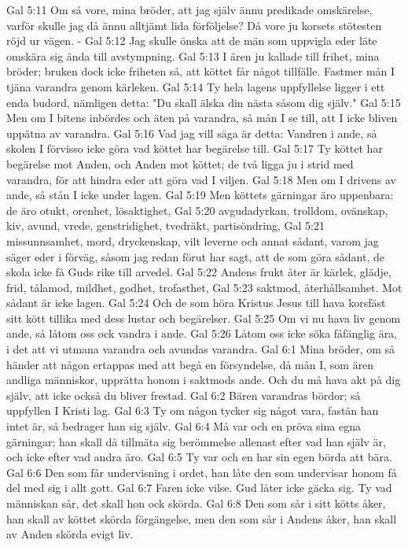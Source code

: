 Gal 5:11  Om så vore, mina bröder, att jag själv ännu predikade omskärelse, varför skulle jag då ännu alltjämt lida förföljelse? Då vore ju korsets stötesten röjd ur vägen. -
Gal 5:12  Jag skulle önska att de män som uppvigla eder läte omskära sig ända till avstympning.
Gal 5:13  I ären ju kallade till frihet, mina bröder; bruken dock icke friheten så, att köttet får något tillfälle. Fastmer mån I tjäna varandra genom kärleken.
Gal 5:14  Ty hela lagens uppfyllelse ligger i ett enda budord, nämligen detta: "Du skall älska din nästa såsom dig själv."
Gal 5:15  Men om I bitens inbördes och äten på varandra, så mån I se till, att I icke bliven uppätna av varandra.
Gal 5:16  Vad jag vill säga är detta: Vandren i ande, så skolen I förvisso icke göra vad köttet har begärelse till.
Gal 5:17  Ty köttet har begärelse mot Anden, och Anden mot köttet; de två ligga ju i strid med varandra, för att hindra eder att göra vad I viljen.
Gal 5:18  Men om I drivens av ande, så stån I icke under lagen.
Gal 5:19  Men köttets gärningar äro uppenbara: de äro otukt, orenhet, lösaktighet,
Gal 5:20  avgudadyrkan, trolldom, ovänskap, kiv, avund, vrede, genstridighet, tvedräkt, partisöndring,
Gal 5:21  missunnsamhet, mord, dryckenskap, vilt leverne och annat sådant, varom jag säger eder i förväg, såsom jag redan förut har sagt, att de som göra sådant, de skola icke få Guds rike till arvedel.
Gal 5:22  Andens frukt åter är kärlek, glädje, frid, tålamod, mildhet, godhet, trofasthet,
Gal 5:23  saktmod, återhållsamhet. Mot sådant är icke lagen.
Gal 5:24  Och de som höra Kristus Jesus till hava korsfäst sitt kött tillika med dess lustar och begärelser.
Gal 5:25  Om vi nu hava liv genom ande, så låtom oss ock vandra i ande.
Gal 5:26  Låtom oss icke söka fåfänglig ära, i det att vi utmana varandra och avundas varandra.
Gal 6:1  Mina bröder, om så händer att någon ertappas med att begå en försyndelse, då mån I, som ären andliga människor, upprätta honom i saktmods ande. Och du må hava akt på dig själv, att icke också du bliver frestad.
Gal 6:2  Bären varandras bördor; så uppfyllen I Kristi lag.
Gal 6:3  Ty om någon tycker sig något vara, fastän han intet är, så bedrager han sig själv.
Gal 6:4  Må var och en pröva sina egna gärningar; han skall då tillmäta sig berömmelse allenast efter vad han själv är, och icke efter vad andra äro.
Gal 6:5  Ty var och en har sin egen börda att bära.
Gal 6:6  Den som får undervisning i ordet, han låte den som undervisar honom få del med sig i allt gott.
Gal 6:7  Faren icke vilse. Gud låter icke gäcka sig. Ty vad människan sår, det skall hon ock skörda.
Gal 6:8  Den som sår i sitt kötts åker, han skall av köttet skörda förgängelse, men den som sår i Andens åker, han skall av Anden skörda evigt liv.
